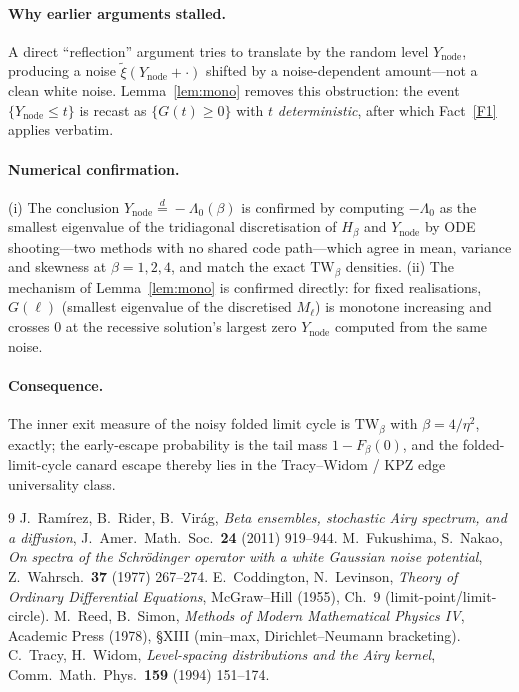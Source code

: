 \documentclass[11pt]{article}
\theoremstyle{definition}
\theoremstyle{remark}
\newcommand{\Ynode}{Y_{\mathrm{node}}}
\newcommand{\TW}{\mathrm{TW}}
\newcommand{\eqd}{\stackrel{d}{=}}
\newcommand{\xit}{\widetilde{\xi}}
\begin{document}
\paragraph{Why earlier arguments stalled.} A direct ``reflection'' argument tries to
translate by the random level $\Ynode$, producing a noise $\xit(\Ynode+\cdot)$ shifted by
a noise-dependent amount---not a clean white noise. Lemma~\ref{lem:mono} removes this
obstruction: the event $\{\Ynode\le t\}$ is recast as $\{G(t)\ge0\}$ with $t$
\emph{deterministic}, after which Fact~\ref{F1} applies verbatim.

\paragraph{Numerical confirmation.} (i) The conclusion $\Ynode\eqd-\Lambda_0(\beta)$ is
confirmed by computing $-\Lambda_0$ as the smallest eigenvalue of the tridiagonal
discretisation of $H_\beta$ and $\Ynode$ by ODE shooting---two methods with no shared
code path---which agree in mean, variance and skewness at $\beta=1,2,4$, and match the
exact $\TW_\beta$ densities. (ii) The mechanism of Lemma~\ref{lem:mono} is confirmed
directly: for fixed realisations, $G(\ell)$ (smallest eigenvalue of the discretised
$M_\ell$) is monotone increasing and crosses $0$ at the recessive solution's largest
zero $\Ynode$ computed from the same noise.

\paragraph{Consequence.} The inner exit measure of the noisy folded limit cycle is
$\TW_\beta$ with $\beta=4/\eta^2$, exactly; the early-escape probability is the tail mass
$1-F_\beta(0)$, and the folded-limit-cycle canard escape thereby lies in the
Tracy--Widom / KPZ edge universality class.

\begin{thebibliography}{9}
 J.~Ram\'irez, B.~Rider, B.~Vir\'ag, \emph{Beta ensembles, stochastic Airy
spectrum, and a diffusion}, J.\ Amer.\ Math.\ Soc.\ \textbf{24} (2011) 919--944.
 M.~Fukushima, S.~Nakao, \emph{On spectra of the Schr\"odinger operator with
a white Gaussian noise potential}, Z.\ Wahrsch.\ \textbf{37} (1977) 267--274.
 E.~Coddington, N.~Levinson, \emph{Theory of Ordinary Differential
Equations}, McGraw--Hill (1955), Ch.~9 (limit-point/limit-circle).
 M.~Reed, B.~Simon, \emph{Methods of Modern Mathematical Physics IV},
Academic Press (1978), \S XIII (min--max, Dirichlet--Neumann bracketing).
 C.~Tracy, H.~Widom, \emph{Level-spacing distributions and the Airy kernel},
Comm.\ Math.\ Phys.\ \textbf{159} (1994) 151--174.
\end{thebibliography}
\end{document}
